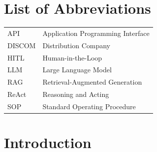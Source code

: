\documentclass[12pt,a4paper,oneside]{report}
\newif\ifguidance
\newcommand{\guide}[1]{%
  \ifguidance
  \begin{tcolorbox}[enhanced,breakable,colback=guidebg,colframe=bmsblue,
    boxrule=0.6pt,arc=2pt,left=6pt,right=6pt,top=4pt,bottom=4pt,
    fonttitle=\bfseries\small,title={What to write here},
    before upper={\small\setstretch{1.1}}]
  #1
  \end{tcolorbox}
  \fi}
\newcommand{\pagebudget}[1]{%
  \ifguidance\noindent{\small\textcolor{bmsblue}{\textbf{Expected length:} #1 pages}}\par\medskip\fi}
\newenvironment{sample}
  {\par\noindent{\footnotesize\bfseries\textcolor{BrickRed}{[SAMPLE --- replace with your own content]}}\par\color{samplecol}}
  {\par\medskip}
\begin{document}
\tableofcontents
\listoffigures
{}
\listoftables
{}

\chapter*{List of Abbreviations}
\thispagestyle{frontmatter}
\guide{List every abbreviation used in the report in alphabetical order. Expand each abbreviation
again at its first use in the main text.}
\begin{sample}
\begin{tabular}{@{}p{2.8cm}l@{}}
API & Application Programming Interface \\
DISCOM & Distribution Company \\
HITL & Human-in-the-Loop \\
LLM & Large Language Model \\
RAG & Retrieval-Augmented Generation \\
ReAct & Reasoning and Acting \\
SOP & Standard Operating Procedure \\
\end{tabular}
\end{sample}

\clearpage
\ClearShipoutPictureBG
\pagestyle{mainbody}

\chapter{Introduction}
\pagebudget{4--6}
\guide{This chapter introduces the sector, the problem and the decision your agent supports, and
explains why an agentic approach is justified. A reader who stops after this chapter should know
exactly what you built and why.}
\end{document}
